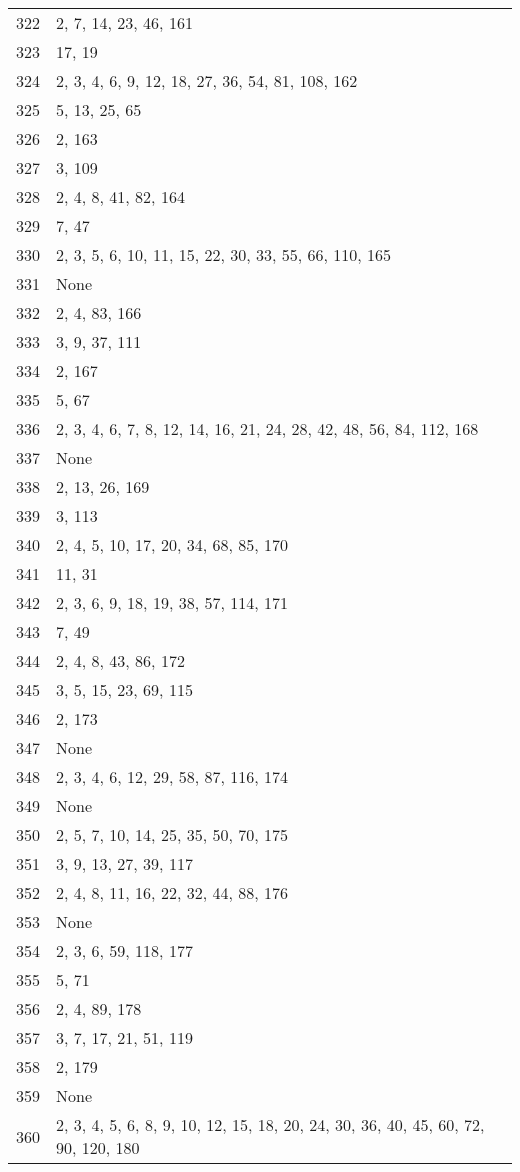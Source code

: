 \documentclass[12pt]{article}
\begin{document}
\begin{tabular}{|r|l|}
322 & 2, 7, 14, 23, 46,  161 \\ 
323 & 17, 19 \\ 
324 & 2, 3, 4, 6, 9, 12, 18, 27, 36, 54, 81, 108, 162 \\ 
325 & 5, 13, 25, 65 \\ 
326 & 2, 163 \\ 
327 & 3, 109 \\ 
328 & 2, 4, 8, 41, 82, 164 \\ 
329 & 7, 47 \\ 
330 & 2, 3, 5, 6, 10, 11, 15, 22, 30, 33,  55, 66, 110, 165 \\ 
331 & None \\ 
332 & 2, 4, 83, 166 \\ 
333 & 3, 9, 37, 111 \\ 
334 & 2, 167 \\ 
335 & 5, 67 \\ 
336 & 2, 3, 4, 6, 7, 8, 12, 14, 16, 21, 24, 28, 42, 48, 56, 84, 112, 168 \\ 
337 & None \\ 
338 & 2, 13, 26, 169 \\ 
339 & 3, 113 \\ 
340 & 2, 4, 5, 10, 17, 20, 34, 68, 85, 170 \\ 
341 & 11, 31 \\ 
342 & 2, 3, 6, 9, 18, 19, 38, 57, 114, 171 \\ 
343 & 7, 49 \\ 
344 & 2, 4, 8, 43, 86, 172 \\ 
345 & 3, 5, 15, 23, 69, 115 \\ 
346 & 2, 173 \\ 
347 & None \\ 
348 & 2, 3, 4, 6, 12, 29, 58, 87, 116, 174 \\ 
349 & None \\ 
350 & 2, 5, 7,  10, 14, 25, 35, 50,  70, 175 \\ 
351 & 3, 9, 13, 27, 39, 117 \\ 
352 & 2, 4, 8, 11, 16, 22, 32, 44, 88, 176 \\ 
353 & None \\ 
354 & 2, 3, 6, 59, 118, 177 \\ 
355 & 5, 71 \\ 
356 & 2, 4, 89, 178 \\ 
357 & 3, 7, 17, 21, 51, 119 \\ 
358 & 2, 179 \\ 
359 & None \\ 
360 & 2, 3, 4, 5,  6, 8, 9, 10, 12, 15, 18, 20, 24, 30, 36, 40, 45, 60, 72, 90, 120, 180 \\ 

\end{tabular}
\end{document}

